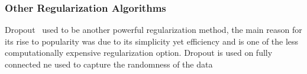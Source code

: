\subsubsection{Other Regularization Algorithms}

Dropout~\cite{JMLR:v15:srivastava14a} used to be another powerful regularization method, the main reason for its rise to popularity was due to its simplicity yet efficiency and is one of the less computationally expensive regularization option. Dropout is used on fully connected ne used to capture the randomness of the data
